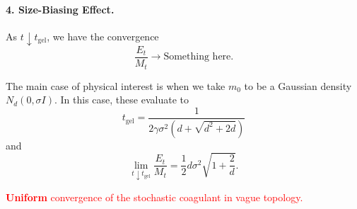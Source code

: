 \begin{theorem}
\paragraph{4. Size-Biasing Effect.} As $t\downarrow t_\text{gel}$, we have the convergence \begin{equation}
    \frac{E_t}{M_t}\rightarrow \text{Something here}.
\end{equation}


The main case of physical interest is when we take $m_0$ to be a Gaussian density $N_d(0, \sigma I)$. In this case, these evaluate to \begin{equation}
    \label{eq: formula of tgel} t_\text{gel} = \frac{1}{2\gamma \sigma^2(d+\sqrt{d^2+2d})}
\end{equation} and \begin{equation}
    \lim_{t\downarrow t_\text{gel}}\frac{E_t}{M_t}=\frac{1}{2}d\sigma^2\sqrt{1+\frac{2}{d}}.
\end{equation} \end{theorem}

\begin{theorem} \label{thrm: convergence of stochastic coagulent}
\textcolor{red}{\textbf{Uniform} convergence of the stochastic coagulant in vague topology.}
\end{theorem}

